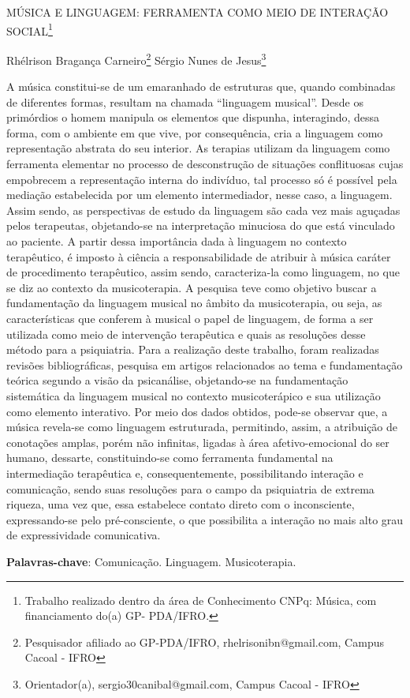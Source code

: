 \documentclass[article,12pt,onesidea,4paper,english,brazil]{abntex2}
\begin{document}
	
	
	\frenchspacing 
	
	\begin{center}
		\LARGE MÚSICA E LINGUAGEM: FERRAMENTA COMO MEIO DE INTERAÇÃO SOCIAL\footnote{Trabalho realizado dentro da área de Conhecimento CNPq: Música, com financiamento do(a) GP-
			PDA/IFRO.}
		
		\normalsize
		Rhélrison Bragança Carneiro\footnote{Pesquisador afiliado ao GP-PDA/IFRO, rhelrisonibn@gmail.com, Campus Cacoal - IFRO} 
		Sérgio Nunes de Jesus\footnote{Orientador(a), sergio30canibal@gmail.com, Campus Cacoal - IFRO} 
		 
	\end{center}
	
	\noindent A música constitui-se de um emaranhado de estruturas que, quando combinadas de
	diferentes formas, resultam na chamada “linguagem musical”. Desde os primórdios o
	homem manipula os elementos que dispunha, interagindo, dessa forma, com o
	ambiente em que vive, por consequência, cria a linguagem como representação
	abstrata do seu interior. As terapias utilizam da linguagem como ferramenta
	elementar no processo de desconstrução de situações conflituosas cujas
	empobrecem a representação interna do indivíduo, tal processo só é possível pela
	mediação estabelecida por um elemento intermediador, nesse caso, a linguagem.
	Assim sendo, as perspectivas de estudo da linguagem são cada vez mais aguçadas
	pelos terapeutas, objetando-se na interpretação minuciosa do que está vinculado ao
	paciente. A partir dessa importância dada à linguagem no contexto terapêutico, é
	imposto à ciência a responsabilidade de atribuir à música caráter de procedimento
	terapêutico, assim sendo, caracteriza-la como linguagem, no que se diz ao contexto
	da musicoterapia. A pesquisa teve como objetivo buscar a fundamentação da
	linguagem musical no âmbito da musicoterapia, ou seja, as características que
	conferem à musical o papel de linguagem, de forma a ser utilizada como meio de
	intervenção terapêutica e quais as resoluções desse método para a psiquiatria. Para
	a realização deste trabalho, foram realizadas revisões bibliográficas, pesquisa em
	artigos relacionados ao tema e fundamentação teórica segundo a visão da
	psicanálise, objetando-se na fundamentação sistemática da linguagem musical no
	contexto musicoterápico e sua utilização como elemento interativo. Por meio dos
	dados obtidos, pode-se observar que, a música revela-se como linguagem
	estruturada, permitindo, assim, a atribuição de conotações amplas, porém não
	infinitas, ligadas à área afetivo-emocional do ser humano, dessarte, constituindo-se
	como ferramenta fundamental na intermediação terapêutica e, consequentemente,
	possibilitando interação e comunicação, sendo suas resoluções para o campo da
	psiquiatria de extrema riqueza, uma vez que, essa estabelece contato direto com o
	inconsciente, expressando-se pelo pré-consciente, o que possibilita a interação no
	mais alto grau de expressividade comunicativa.
	
	\vspace{\onelineskip}
	
	\noindent
	\textbf{Palavras-chave}: Comunicação. Linguagem. Musicoterapia.
	
\end{document}
